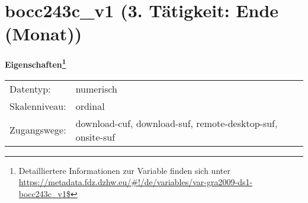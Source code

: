 
    \setcounter{footnote}{0}

    \vspace*{-1.8cm}
	\section{bocc243c\_v1 (3. Tätigkeit: Ende (Monat))}
	\label{section:bocc243c_v1}



    \vspace*{0.5cm}
    \noindent\textbf{Eigenschaften\footnote{Detailliertere Informationen zur Variable finden sich unter
		\url{https://metadata.fdz.dzhw.eu/\#!/de/variables/var-gra2009-ds1-bocc243c_v1$}}}\\
	\begin{tabularx}{\hsize}{@{}lX}
	Datentyp: & numerisch \\
	Skalenniveau: & ordinal \\
	Zugangswege: &
	  download-cuf, 
	  download-suf, 
	  remote-desktop-suf, 
	  onsite-suf
 \\
    \end{tabularx}



